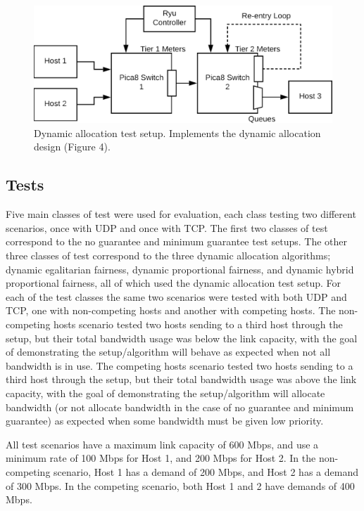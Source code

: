 \documentclass[accepted,single]{gipaper}
\begin{document}
\begin{figure}
	\centering
	\includegraphics[width=6in]{figs/dba_setup.png}
	\caption{ Dynamic allocation test setup. Implements the dynamic allocation design (Figure 4). } \label{dba_setup}
\end{figure}

\subsection{Tests}
\label{result_tests}

Five main classes of test were used for evaluation, each class testing two different scenarios, once with UDP and once with TCP. The first two classes of test correspond to the no guarantee and minimum guarantee test setups. The other three classes of test correspond to the three dynamic allocation algorithms; dynamic egalitarian fairness, dynamic proportional fairness, and dynamic hybrid proportional fairness, all of which used the dynamic allocation test setup. For each of the test classes the same two scenarios were tested with both UDP and TCP, one with non-competing hosts and another with competing hosts. The non-competing hosts scenario tested two hosts sending to a third host through the setup, but their total bandwidth usage was below the link capacity, with the goal of demonstrating the setup/algorithm will behave as expected when not all bandwidth is in use. The competing hosts scenario tested two hosts sending to a third host through the setup, but their total bandwidth usage was above the link capacity, with the goal of demonstrating the setup/algorithm will allocate bandwidth (or not allocate bandwidth in the case of no guarantee and minimum guarantee) as expected when some bandwidth must be given low priority.

All test scenarios have a maximum link capacity of 600 Mbps, and use a minimum rate of 100 Mbps for Host 1, and 200 Mbps for Host 2. In the non-competing scenario, Host 1 has a demand of 200 Mbps, and Host 2 has a demand of 300 Mbps. In the competing scenario, both Host 1 and 2 have demands of 400 Mbps.
\end{document}
